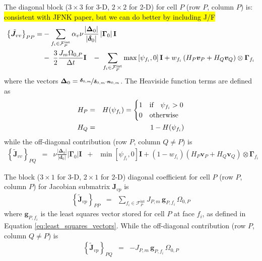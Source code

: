 \documentclass[sn-mathphys,Numbered]{sn-jnl}%
\newcommand{\bb}{\boldsymbol}
\begin{document}
The diagonal block ($3\times3$ for 3-D, $2\times2$ for 2-D) for cell $P$ (row $P$, column $P$) is: \hl{consistent with JFNK paper, but we can do better by including J/F}
\begin{align}
    	\left\{ \tilde{\bb{J}}_{vv} \right\}_{PP} =&
	- \sum_{f_i \in \mathcal{F}^{\text{int}}_P} \alpha_v \nu
	\frac{ \left|\bb{\Delta}_0 \right| }{\left|\bb{\delta}_0 \right|}  \left|\bb{\Gamma}_0 \right| \textbf{I} \notag \\
	& - \; \frac{3}{2} \frac{J_m \Omega_{0,P}}{\Delta t} \textbf{I}
	\;\;\; - \; \sum_{f_i \in \mathcal{F}^{\text{int}}_P}
	\max \left[\psi_{f_i}, 0\right] \textbf{I} + w_{f_i} \left( H_P \bb{v}_P + H_Q \bb{v}_Q \right) \otimes \mathbf{\Gamma}_{f_i}
\end{align}
where the vectors $\bb{\Delta}_0 = \nicefrac{\bb{\delta}_{0,m}}{\bb{\delta}_{0,m} \cdot \bb{n}_{0,m}}$.
The Heaviside function terms are defined as
\begin{eqnarray}
	H_P &=& H(\psi_{f_i}) =
	\begin{cases}
		1  & \text{if} \quad \psi_{f_i} > 0 \\
		0  & \text{otherwise}
	\end{cases} \notag \\
	H_Q &=& 1 - H(\psi_{f_i})
\end{eqnarray}
while the off-diagonal contribution (row $P$, column $Q \neq P$) is
\begin{eqnarray}
    	\left\{ \tilde{\bb{J}}_{vv} \right\}_{PQ} &=&
	\nu \frac{ \left|\bb{\Delta}_0 \right| }{\left|\bb{d}_0 \right|}  \left|\bb{\Gamma}_0 \right| \textbf{I}
	\;\; + \;\; \min \left[\psi_{f_i}, 0\right] \textbf{I} + (1 - w_{f_i}) \left( H_P \bb{v}_P + H_Q \bb{v}_Q \right) \otimes \mathbf{\Gamma}_{f_i}
\end{eqnarray}

The block ($3\times1$ for 3-D, $2\times1$ for 2-D) diagonal coefficient for cell $P$ (row $P$, column $P$) for Jacobian submatrix $\bb{J}_{vp}$ is
\begin{eqnarray}
	\left\{
	\tilde{\bb{J}}_{vp} 
	\right\}_{PP}
	&=& \sum_{f_i \in \mathcal{F}^{\text{int}}_P} J_{P,m} \, \bb{g}_{P,f_i} \,  \Omega_{0,P}
\end{eqnarray}
where $\bb{g}_{P, f_i}$ is the least squares vector stored for cell $P$ at face $f_i$, as defined in Equation \ref{eq:least_squares_vectors}.
While the off-diagonal contribution (row $P$, column $Q \neq P$) is
\begin{eqnarray}
	\left\{
	\tilde{\bb{J}}_{vp} 
	\right\}_{PQ}
	&=& -J_{P,m} \, \bb{g}_{P,f_i} \,  \Omega_{0,P}
\end{eqnarray}
\end{document}
